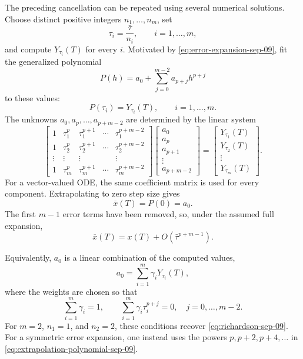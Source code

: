The preceding cancellation can be repeated using several numerical
solutions. Choose distinct positive integers \(n_1,\ldots,n_m\), set
\[
  \tau_i=\frac{\bar\tau}{n_i},
  \qquad i=1,\ldots,m,
\]
and compute \(Y_{\tau_i}(T)\) for every \(i\). Motivated by
\eqref{eq:error-expansion-sep-09}, fit the generalized polynomial
\begin{equation}\label{eq:extrapolation-polynomial-sep-09}
  P(h)=a_0+\sum_{j=0}^{m-2}a_{p+j}h^{p+j}
\end{equation}
to these values:
\begin{equation}\label{eq:extrapolation-interpolation-sep-09}
  P(\tau_i)=Y_{\tau_i}(T),
  \qquad i=1,\ldots,m.
\end{equation}
The unknowns \(a_0,a_p,\ldots,a_{p+m-2}\) are determined by the linear
system
\[
  \begin{bmatrix}
    1&\tau_1^p&\tau_1^{p+1}&\cdots&\tau_1^{p+m-2}\\
    1&\tau_2^p&\tau_2^{p+1}&\cdots&\tau_2^{p+m-2}\\
    \vdots&\vdots&\vdots&&\vdots\\
    1&\tau_m^p&\tau_m^{p+1}&\cdots&\tau_m^{p+m-2}
  \end{bmatrix}
  \begin{bmatrix}
    a_0\\a_p\\a_{p+1}\\\vdots\\a_{p+m-2}
  \end{bmatrix}
  =
  \begin{bmatrix}
    Y_{\tau_1}(T)\\Y_{\tau_2}(T)\\\vdots\\Y_{\tau_m}(T)
  \end{bmatrix}.
\]
For a vector-valued ODE, the same coefficient matrix is used for every
component. Extrapolating to zero step size gives
\begin{equation}\label{eq:general-extrapolate-sep-09}
  \overline{x}(T)=P(0)=a_0.
\end{equation}
The first \(m-1\) error terms have been removed, so, under the assumed
full expansion,
\[
  \overline{x}(T)=x(T)+O(\bar\tau^{p+m-1}).
\]

Equivalently, \(a_0\) is a linear combination of the computed values,
\[
  a_0=\sum_{i=1}^m\gamma_iY_{\tau_i}(T),
\]
where the weights are chosen so that
\[
  \sum_{i=1}^m\gamma_i=1,
  \qquad
  \sum_{i=1}^m\gamma_i\tau_i^{p+j}=0,
  \quad j=0,\ldots,m-2.
\]
For \(m=2\), \(n_1=1\), and \(n_2=2\), these conditions recover
\eqref{eq:richardson-sep-09}. For a symmetric error expansion, one
instead uses the powers \(p,p+2,p+4,\ldots\) in
\eqref{eq:extrapolation-polynomial-sep-09}.

